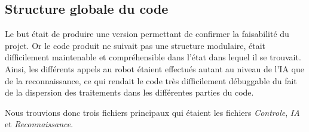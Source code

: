     \pagebreak

    \subsection{Structure globale du code}
    \par Le but était de produire une version permettant de confirmer la faisabilité du projet.
    Or le code produit ne suivait pas une structure modulaire, était difficilement maintenable et compréhensible dans l'état dans lequel il se trouvait.
    Ainsi, les différents appels au robot étaient effectués autant au niveau de l'IA que de la reconnaissance, ce qui rendait le code très difficilement débuggable du fait de la dispersion des traitements dans les différentes parties du code.

    \par Nous trouvions donc trois fichiers principaux qui étaient les fichiers \textit{Controle}, \textit{IA} et \textit{Reconnaissance}.

\pagebreak
